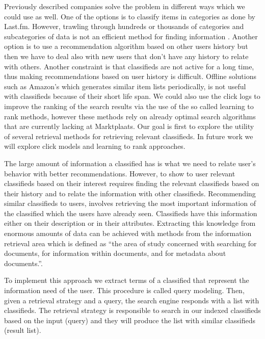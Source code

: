 Previously described companies solve the problem in different ways which we could use as well. One of the options is to classify items in categories as done by Last.fm. However, trawling through hundreds or thousands of categories and subcategories of data is not an efficient method for finding information \cite{HatcherMcCandless}.  Another option is to use a recommendation algorithm based on other users history but then we have to deal also with new users that don't have any history to relate with others. Another constraint is that classifieds are not active for a long time, thus making recommendations based on user history is difficult. Offline solutions such as Amazon's which generates similar item lists periodically, is not useful with classifieds because of their short life span. We could also use the click logs to improve the ranking of the search results via the use of the so called learning to rank methods, however these methods rely on already optimal search algorithms that are currently lacking at Marktplaats. Our goal is first to explore the utility of several retrieval methods for retrieving relevant classifieds. In future work we will explore click models and learning to rank approaches.

The large amount of information a classified has is what we need to relate user’s behavior with better recommendations. However, to show to user relevant classifieds based on their interest requires finding the relevant classifieds based on their history and to relate the information with other classifieds. Recommending similar classifieds to users, involves retrieving the most important information of the classified which the users have already seen. Classifieds have this information either on their description or in their attributes. Extracting this knowledge from enormous amounts of data can be achieved with methods from the information retrieval area which is defined as ``the area of study concerned with searching for documents, for information within documents, and for metadata about documents.''\cite{SinghSingh}.

To implement this approach we extract terms of a classified that represent the information need of the user. This procedure is called query modeling. Then, given a retrieval strategy and a query, the search engine responds with a list with classifieds. The retrieval strategy is responsible to search in our indexed classifieds based on the input (query) and they will produce the list with similar classifieds (result list).

